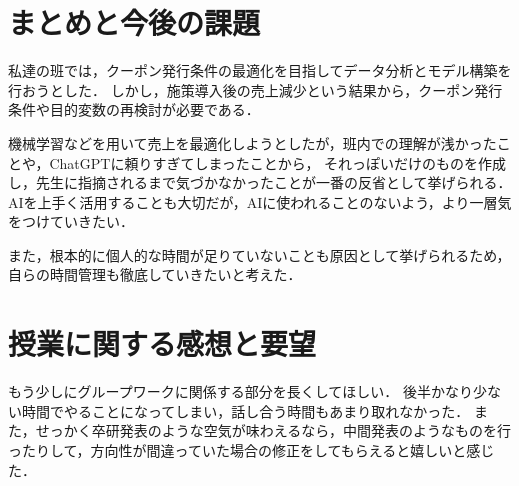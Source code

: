 \documentclass[titlepage,a4paper]{jsarticle}
\begin{document}
\section{まとめと今後の課題}
私達の班では，クーポン発行条件の最適化を目指してデータ分析とモデル構築を行おうとした．
しかし，施策導入後の売上減少という結果から，クーポン発行条件や目的変数の再検討が必要である．

機械学習などを用いて売上を最適化しようとしたが，班内での理解が浅かったことや，ChatGPTに頼りすぎてしまったことから，
それっぽいだけのものを作成し，先生に指摘されるまで気づかなかったことが一番の反省として挙げられる．
AIを上手く活用することも大切だが，AIに使われることのないよう，より一層気をつけていきたい．


また，根本的に個人的な時間が足りていないことも原因として挙げられるため，自らの時間管理も徹底していきたいと考えた．
\section{授業に関する感想と要望}
もう少しにグループワークに関係する部分を長くしてほしい．
後半かなり少ない時間でやることになってしまい，話し合う時間もあまり取れなかった．
また，せっかく卒研発表のような空気が味わえるなら，中間発表のようなものを行ったりして，方向性が間違っていた場合の修正をしてもらえると嬉しいと感じた．


\end{document}
